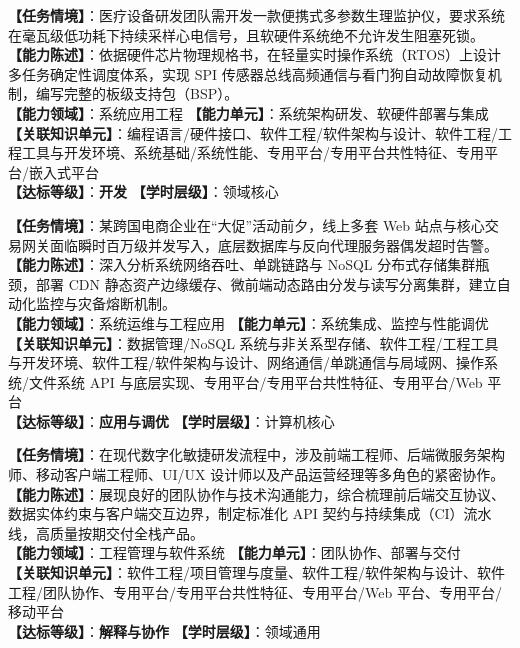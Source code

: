 \begin{taskbox}[任务 8：面向严苛硬件指标的高可靠嵌入式系统架构设计与协议研发]
\textbf{【任务情境】}：医疗设备研发团队需开发一款便携式多参数生理监护仪，要求系统在毫瓦级低功耗下持续采样心电信号，且软硬件系统绝不允许发生阻塞死锁。\\
\textbf{【能力陈述】}：依据硬件芯片物理规格书，在轻量实时操作系统（RTOS）上设计多任务确定性调度体系，实现 SPI 传感器总线高频通信与看门狗自动故障恢复机制，编写完整的板级支持包（BSP）。\\
\textbf{【能力领域】}：系统应用工程 \quad \textbf{【能力单元】}：系统架构研发、软硬件部署与集成\\
\textbf{【关联知识单元】}：编程语言/硬件接口、软件工程/软件架构与设计、软件工程/工程工具与开发环境、系统基础/系统性能、专用平台/专用平台共性特征、专用平台/嵌入式平台\\
\textbf{【达标等级】}：\textbf{开发} \quad \textbf{【学时层级】}：领域核心
\end{taskbox}

\begin{taskbox}
\textbf{【任务情境】}：某跨国电商企业在“大促”活动前夕，线上多套 Web 站点与核心交易网关面临瞬时百万级并发写入，底层数据库与反向代理服务器偶发超时告警。\\
\textbf{【能力陈述】}：深入分析系统网络吞吐、单跳链路与 NoSQL 分布式存储集群瓶颈，部署 CDN 静态资产边缘缓存、微前端动态路由分发与读写分离集群，建立自动化监控与灾备熔断机制。\\
\textbf{【能力领域】}：系统运维与工程应用 \quad \textbf{【能力单元】}：系统集成、监控与性能调优\\
\textbf{【关联知识单元】}：数据管理/NoSQL 系统与非关系型存储、软件工程/工程工具与开发环境、软件工程/软件架构与设计、网络通信/单跳通信与局域网、操作系统/文件系统 API 与底层实现、专用平台/专用平台共性特征、专用平台/Web 平台\\
\textbf{【达标等级】}：\textbf{应用与调优} \quad \textbf{【学时层级】}：计算机核心
\end{taskbox}

\begin{taskbox}[任务 10：跨职能团队协同交付企业级高可用全栈平台解决方案]
\textbf{【任务情境】}：在现代数字化敏捷研发流程中，涉及前端工程师、后端微服务架构师、移动客户端工程师、UI/UX 设计师以及产品运营经理等多角色的紧密协作。\\
\textbf{【能力陈述】}：展现良好的团队协作与技术沟通能力，综合梳理前后端交互协议、数据实体约束与客户端交互边界，制定标准化 API 契约与持续集成（CI）流水线，高质量按期交付全栈产品。\\
\textbf{【能力领域】}：工程管理与软件系统 \quad \textbf{【能力单元】}：团队协作、部署与交付\\
\textbf{【关联知识单元】}：软件工程/项目管理与度量、软件工程/软件架构与设计、软件工程/团队协作、专用平台/专用平台共性特征、专用平台/Web 平台、专用平台/移动平台\\
\textbf{【达标等级】}：\textbf{解释与协作} \quad \textbf{【学时层级】}：领域通用
\end{taskbox}

